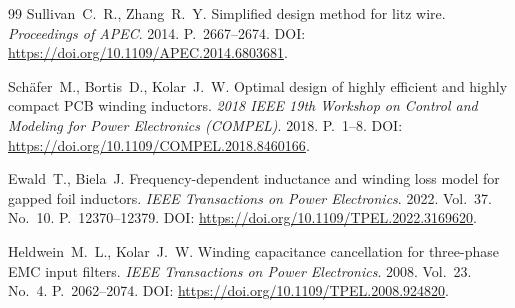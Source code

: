 \documentclass[14pt,a4paper]{extarticle}
\begin{document}
\begin{thebibliography}{99}
Sullivan~C.~R., Zhang~R.~Y.
Simplified design method for litz wire.
\textit{Proceedings of APEC}. 2014. P.~2667--2674.
DOI: \url{https://doi.org/10.1109/APEC.2014.6803681}.

Schäfer~M., Bortis~D., Kolar~J.~W.
Optimal design of highly efficient and highly compact PCB winding
inductors.
\textit{2018 IEEE 19th Workshop on Control and Modeling for Power
Electronics (COMPEL)}. 2018. P.~1--8.
DOI: \url{https://doi.org/10.1109/COMPEL.2018.8460166}.

Ewald~T., Biela~J.
Frequency-dependent inductance and winding loss model for gapped foil
inductors.
\textit{IEEE Transactions on Power Electronics}. 2022. Vol.~37. No.~10.
P.~12370--12379.
DOI: \url{https://doi.org/10.1109/TPEL.2022.3169620}.

Heldwein~M.~L., Kolar~J.~W.
Winding capacitance cancellation for three-phase EMC input filters.
\textit{IEEE Transactions on Power Electronics}. 2008. Vol.~23. No.~4.
P.~2062--2074.
DOI: \url{https://doi.org/10.1109/TPEL.2008.924820}.

\end{thebibliography}
\end{document}

